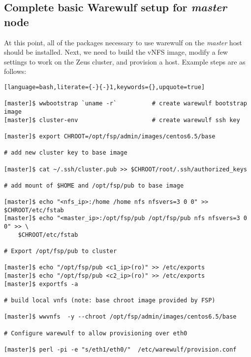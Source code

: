 \documentclass[letterpaper]{article}
\begin{document}
\subsection{Complete basic Warewulf setup for {\em master} node}

At this point, all of the packages necessary to use warewulf on the {\em master}
host should be installed.  Next, we need to build the vNFS image, modify a few
settings to work on the Zeus cluster, and provision a host. Example steps are
as follows:

\vspace*{0.2cm}


\begin{lstlisting}[language=bash,literate={-}{-}1,keywords={},upquote=true]

[master]$ wwbootstrap `uname -r`          # create warewulf bootstrap image
[master]$ cluster-env                     # create warewulf ssh key

[master]$ export CHROOT=/opt/fsp/admin/images/centos6.5/base

# add new cluster key to base image

[master]$ cat ~/.ssh/cluster.pub >> $CHROOT/root/.ssh/authorized_keys

# add mount of $HOME and /opt/fsp/pub to base image

[master]$ echo "<nfs_ip>:/home /home nfs nfsvers=3 0 0" >> $CHROOT/etc/fstab
[master]$ echo "<master_ip>:/opt/fsp/pub /opt/fsp/pub nfs nfsvers=3 0 0" >> \
    $CHROOT/etc/fstab

# Export /opt/fsp/pub to cluster

[master]$ echo "/opt/fsp/pub <c1_ip>(ro)" >> /etc/exports
[master]$ echo "/opt/fsp/pub <c2_ip>(ro)" >> /etc/exports
[master]$ exportfs -a

# build local vnfs (note: base chroot image provided by FSP)

[master]$ wwvnfs  -y --chroot /opt/fsp/admin/images/centos6.5/base

# Configure warewulf to allow provisioning over eth0

[master]$ perl -pi -e "s/eth1/eth0/"  /etc/warewulf/provision.conf 
\end{lstlisting}

\end{document}
